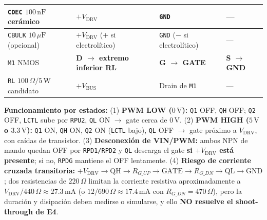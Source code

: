 \documentclass[10pt, a4paper, landscape]{article}
\begin{document}
{\begin{tabularx}{\linewidth}{|>{\raggedright\arraybackslash}p{6.2cm}|>{\raggedright\arraybackslash}p{4.8cm}|>{\raggedright\arraybackslash}p{5.2cm}|>{\raggedright\arraybackslash}X|}
\texttt{CDEC} $100\,\text{nF}$ cerámico & $+V_{\text{DRV}}$ & \texttt{GND} & --- \\ \hline
\texttt{CBULK} $10\,\mu\text{F}$ (opcional) & $+V_{\text{DRV}}$ ($+$ si electrolítico) & \texttt{GND} ($-$ si electrolítico) & --- \\ \hline
\texttt{M1} NMOS & \textbf{D $\rightarrow$ extremo inferior RL} & \textbf{G $\rightarrow$ GATE} & \textbf{S $\rightarrow$ GND} \\ \hline
\texttt{RL} $100\,\Omega / 5\,\text{W}$ candidato & $+V_{\text{BUS}}$ & Drain de \texttt{M1} & --- \\ \hline
\end{tabularx}
}

\vspace{0.12cm}
\noindent
\textbf{Funcionamiento por estados:} (1) \textbf{PWM LOW ($0\,\text{V}$):} \texttt{Q1} OFF, \texttt{QH} OFF; \texttt{Q2} OFF, \texttt{LCTL} sube por \texttt{RPU2}, \texttt{QL} ON $\rightarrow$ gate cerca de $0\,\text{V}$. (2) \textbf{PWM HIGH ($5\,\text{V}$ o $3.3\,\text{V}$):} \texttt{Q1} ON, \texttt{QH} ON, \texttt{Q2} ON (\texttt{LCTL} bajo), \texttt{QL} OFF $\rightarrow$ gate próximo a $V_{\text{DRV}}$, con caídas de transistor. (3) \textbf{Desconexión de VIN/PWM:} ambos NPN de mando quedan OFF por \texttt{RPD1/RPD2} y \texttt{QL} descarga el gate \textbf{si $+V_{\text{DRV}}$ está presente}; si no, \texttt{RPDG} mantiene el OFF lentamente. (4) \textbf{Riesgo de corriente cruzada transitoria:} $+V_{\text{DRV}} \rightarrow \text{QH} \rightarrow R_{G\_UP} \rightarrow \text{GATE} \rightarrow R_{G\_DN} \rightarrow \text{QL} \rightarrow \text{GND}$; dos resistencias de $220\,\Omega$ limitan la corriente resistiva aproximadamente a $V_{\text{DRV}}/440\,\Omega \approx 27.3\,\text{mA}$ (o $12/690\,\Omega \approx 17.4\,\text{mA}$ con $R_{G\_DN}=470\,\Omega$), pero la duración y disipación deben medirse o simularse, y ello \textbf{NO resuelve el shoot-through de E4}.
\end{document}
